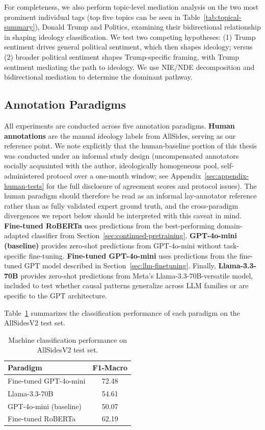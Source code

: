 For completeness, we also perform topic-level mediation analysis on the two most prominent individual tags (top five topics can be seen in Table~\ref{tab:topical-summary}), Donald Trump and Politics, examining their bidirectional relationship in shaping ideology classification. We test two competing hypotheses: (1) Trump sentiment drives general political sentiment, which then shapes ideology; versus (2) broader political sentiment shapes Trump-specific framing, with Trump sentiment mediating the path to ideology. We use NIE/NDE decomposition and bidirectional mediation to determine the dominant pathway.

\subsection{Annotation Paradigms}
\label{sec:annotation-paradigms}

All experiments are conducted across five annotation paradigms. \textbf{Human annotations} are the manual ideology labels from AllSides, serving as our reference point. We note explicitly that the human-baseline portion of this thesis was conducted under an informal study design (uncompensated annotators socially acquainted with the author, ideologically homogeneous pool, self-administered protocol over a one-month window; see Appendix~\ref{sec:appendix-human-tests} for the full disclosure of agreement scores and protocol issues). The human paradigm should therefore be read as an informal lay-annotator reference rather than as fully validated expert ground truth, and the cross-paradigm divergences we report below should be interpreted with this caveat in mind. \textbf{Fine-tuned RoBERTa} uses predictions from the best-performing domain-adapted classifier from Section~\ref{sec:continued-pretraining}. \textbf{GPT-4o-mini (baseline)} provides zero-shot predictions from GPT-4o-mini without task-specific fine-tuning. \textbf{Fine-tuned GPT-4o-mini} uses predictions from the fine-tuned GPT model described in Section~\ref{sec:llm-finetuning}. Finally, \textbf{Llama-3.3-70B} provides zero-shot predictions from Meta's Llama-3.3-70B-versatile model, included to test whether causal patterns generalize across LLM families or are specific to the GPT architecture.

Table~\ref{tab:llm-causal-performance} summarizes the classification performance of each paradigm on the AllSidesV2 test set.

\begin{table}[h]
    \centering
    \begin{tabular}{lc}
    \toprule
    \textbf{Paradigm} & \textbf{F1-Macro} \\
    \midrule
    Fine-tuned GPT-4o-mini & 72.48 \\
    Llama-3.3-70B & 54.61 \\
    GPT-4o-mini (baseline) & 50.07 \\
    Fine-tuned RoBERTa & 62.19 \\
    \bottomrule
    \end{tabular}
    \caption{Machine classification performance on AllSidesV2 test set.}
    \label{tab:llm-causal-performance}
\end{table}

